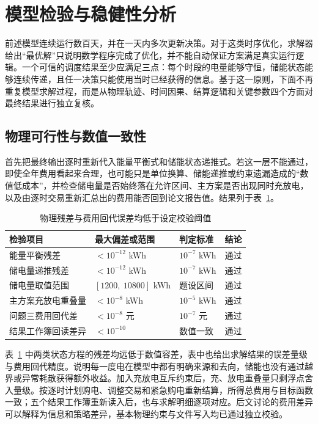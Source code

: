 \section{模型检验与稳健性分析}
\label{sec:validation}

前述模型连续运行数百天，并在一天内多次更新决策。对于这类时序优化，求解器给出“最优解”只说明数学程序完成了优化，并不能自动保证方案满足真实运行逻辑。一个可信的调度结果至少应满足三点：每个时段的电量能够守恒，储能状态能够连续传递，且任一决策只能使用当时已经获得的信息。基于这一原则，下面不再重复模型求解过程，而是从物理轨迹、时间因果、结算逻辑和关键参数四个方面对最终结果进行独立复核。

\subsection{物理可行性与数值一致性}

首先把最终输出逐时重新代入能量平衡式和储能状态递推式。若这一层不能通过，即使全年费用看起来合理，也可能只是单位换算、储能递推或约束遗漏造成的“数值低成本”，并检查储电量是否始终落在允许区间、主方案是否出现同时充放电，以及由逐时交易重新汇总出的费用能否回到论文报告值。结果列于表~\ref{tab:validation}。

\begin{table}[htbp]
    \caption{物理残差与费用回代误差均低于设定校验阈值}
    \label{tab:validation}
    \centering
    \begin{tabular}{l l l l}
        \toprule
        检验项目 & 最大偏差或范围 & 判定标准 & 结论 \\
        \midrule
        能量平衡残差 & $<10^{-12}$ kWh & $10^{-7}$ kWh & 通过 \\
        储电量递推残差 & $<10^{-12}$ kWh & $10^{-7}$ kWh & 通过 \\
        储电量取值范围 & $[1200,\ 10800]$ kWh & 题设区间 & 通过 \\
        主方案充放电重叠量 & $<10^{-8}$ kWh & $10^{-5}$ kWh & 通过 \\
        问题三费用回代差 & $<10^{-8}$ 元 & $10^{-7}$ 元 & 通过 \\
        结果工作簿回读差异 & $<10^{-10}$ & 数值一致 & 通过 \\
        \bottomrule
    \end{tabular}
\end{table}

表~\ref{tab:validation} 中两类状态方程的残差均远低于数值容差，表中也给出求解结果的误差量级与费用回代精度。说明每一度电在模型中都有明确来源和去向，储能也没有通过越界或异常耗散获得额外收益。加入充放电互斥约束后，充、放电重叠量只剩浮点舍入量级。按逐时计划购电、调整交易和紧急购电重新结算，所得总费用与目标函数一致；五个结果工作簿重新读入后，也与求解明细逐项对应。后文讨论的费用差异可以解释为信息和策略差异，基本物理约束与文件写入均已通过独立校验。

